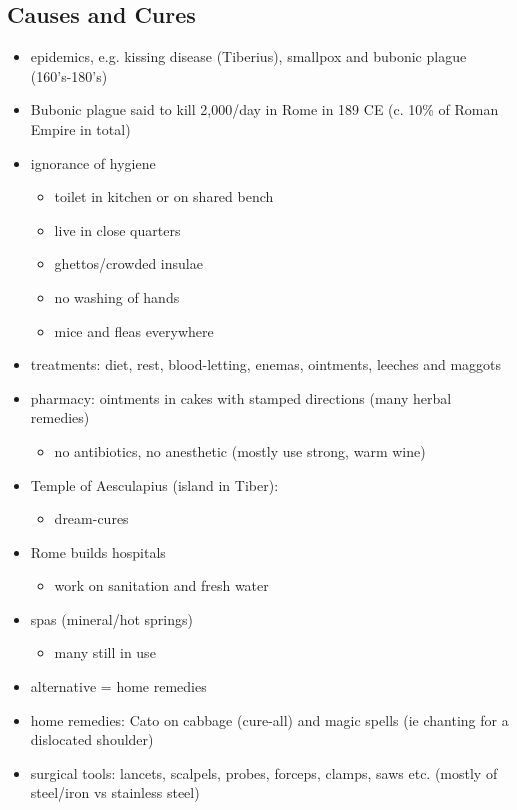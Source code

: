 \documentclass[12pt, twoside]{article}
\begin{document}
\begin{itemize}
\subsection{Causes and Cures}
\begin{itemize}
\item epidemics, e.g. kissing disease (Tiberius), smallpox and bubonic plague (160's-180's)
\item Bubonic plague said to kill 2,000/day in Rome in 189 CE (c. 10\% of Roman Empire in total)
\item ignorance of hygiene
	\begin{itemize}
	\item toilet in kitchen or on shared bench
	\item live in close quarters
	\item ghettos/crowded insulae
	\item no washing of hands
	\item mice and fleas everywhere
	\end{itemize}
\item treatments: diet, rest, blood-letting, enemas, ointments, leeches and maggots
\item pharmacy: ointments in cakes with stamped directions (many herbal remedies)	
	\begin{itemize}
	\item no antibiotics, no 	anesthetic (mostly 	use strong, warm wine)
	\end{itemize}
\item Temple of Aesculapius (island in Tiber): 
	\begin{itemize}
	\item dream-cures
	\end{itemize}
\item Rome builds hospitals
	\begin{itemize}
	\item work on sanitation and fresh water
	\end{itemize}
\item spas (mineral/hot springs)
	\begin{itemize}
	\item many still in use
	\end{itemize}
\item alternative = home remedies
\item home remedies: Cato on cabbage (cure-all) and magic spells (ie chanting for a dislocated shoulder)
\item surgical tools: lancets, scalpels, probes, forceps, clamps, saws etc. (mostly of steel/iron vs stainless steel)
\end{itemize}


\end{itemize}
\end{document}
